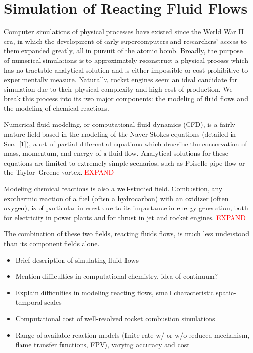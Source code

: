 \section{Simulation of Reacting Fluid Flows}

Computer simulations of physical processes have existed since the World War II era, in which the development of early supercomputers and researchers' access to them expanded greatly, all in pursuit of the atomic bomb. Broadly, the purpose of numerical simulations is to approximately reconstruct a physical process which has no tractable analytical solution and is either impossible or cost-prohibitive to experimentally measure. Naturally, rocket engines seem an ideal candidate for simulation due to their physical complexity and high cost of production. We break this process into its two major components: the modeling of fluid flows and the modeling of chemical reactions.

Numerical fluid modeling, or computational fluid dynamics (CFD), is a fairly mature field based in the modeling of the Naver-Stokes equations (detailed in Sec.~\ref{1}), a set of partial differential equations which describe the conservation of mass, momentum, and energy of a fluid flow. Analytical solutions for these equations are limited to extremely simple scenarios, such as Poiselle pipe flow or the Taylor--Greene vortex. \textcolor{red}{EXPAND}

Modeling chemical reactions is also a well-studied field. Combustion, any exothermic reaction of a fuel (often a hydrocarbon) with an oxidizer (often oxygen), is of particular interest due to its importance in energy generation, both for electricity in power plants and for thrust in jet and rocket engines. \textcolor{red}{EXPAND}

The combination of these two fields, reacting fluids flows, is much less understood than its component fields alone.

\begin{itemize}
    \item Brief description of simulating fluid flows
    \item Mention difficulties in computational chemistry, idea of continuum?
    \item Explain difficulties in modeling reacting flows, small characteristic spatio-temporal scales
    \item Computational cost of well-resolved rocket combustion simulations
    \item Range of available reaction models (finite rate w/ or w/o reduced mechanism, flame transfer functions, FPV), varying accuracy and cost
\end{itemize}